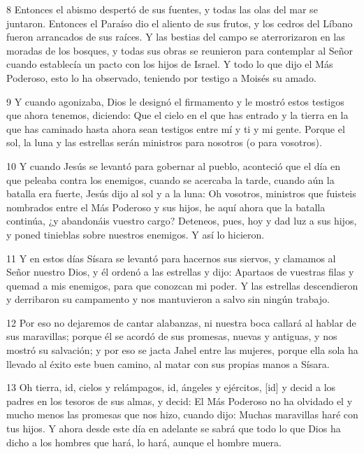 \par 8 Entonces el abismo despertó de sus fuentes, y todas las olas del mar se juntaron. Entonces el Paraíso dio el aliento de sus frutos, y los cedros del Líbano fueron arrancados de sus raíces. Y las bestias del campo se aterrorizaron en las moradas de los bosques, y todas sus obras se reunieron para contemplar al Señor cuando establecía un pacto con los hijos de Israel. Y todo lo que dijo el Más Poderoso, esto lo ha observado, teniendo por testigo a Moisés su amado.

\par 9 Y cuando agonizaba, Dios le designó el firmamento y le mostró estos testigos que ahora tenemos, diciendo: Que el cielo en el que has entrado y la tierra en la que has caminado hasta ahora sean testigos entre mí y ti y mi gente. Porque el sol, la luna y las estrellas serán ministros para nosotros (o para vosotros).

\par 10 Y cuando Jesús se levantó para gobernar al pueblo, aconteció que el día en que peleaba contra los enemigos, cuando se acercaba la tarde, cuando aún la batalla era fuerte, Jesús dijo al sol y a la luna: Oh vosotros, ministros que fuisteis nombrados entre el Más Poderoso y sus hijos, he aquí ahora que la batalla continúa, ¿y abandonáis vuestro cargo? Deteneos, pues, hoy y dad luz a sus hijos, y poned tinieblas sobre nuestros enemigos. Y así lo hicieron.

\par 11 Y en estos días Sísara se levantó para hacernos sus siervos, y clamamos al Señor nuestro Dios, y él ordenó a las estrellas y dijo: Apartaos de vuestras filas y quemad a mis enemigos, para que conozcan mi poder. Y las estrellas descendieron y derribaron su campamento y nos mantuvieron a salvo sin ningún trabajo.

\par 12 Por eso no dejaremos de cantar alabanzas, ni nuestra boca callará al hablar de sus maravillas; porque él se acordó de sus promesas, nuevas y antiguas, y nos mostró su salvación; y por eso se jacta Jahel entre las mujeres, porque ella sola ha llevado al éxito este buen camino, al matar con sus propias manos a Sísara.

\par 13 Oh tierra, id, cielos y relámpagos, id, ángeles y ejércitos, [id] y decid a los padres en los tesoros de sus almas, y decid: El Más Poderoso no ha olvidado el y mucho menos las promesas que nos hizo, cuando dijo: Muchas maravillas haré con tus hijos. Y ahora desde este día en adelante se sabrá que todo lo que Dios ha dicho a los hombres que hará, lo hará, aunque el hombre muera.

